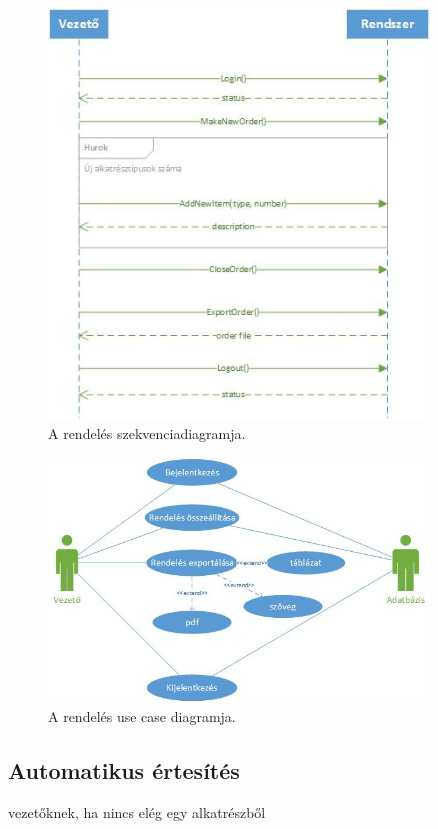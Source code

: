 \documentclass[11pt]{article}\usepackage[left=20mm,right=20mm,top=15mm,bottom=20mm]{geometry}
\begin{document}
\begin{figure}[!h]
    \centering
        \includegraphics[width=0.9\textwidth]{figures/rendeles_SD.jpg}
        \caption{A rendelés szekvenciadiagramja.}
\end{figure}

\begin{figure}[!h]
    \centering
        \includegraphics[width=0.9\textwidth]{figures/rendeles_UC.jpg}
        \caption{A rendelés use case diagramja.}
\end{figure}

\subsection{Automatikus értesítés}
vezetőknek, ha nincs elég egy alkatrészből
\end{document}
